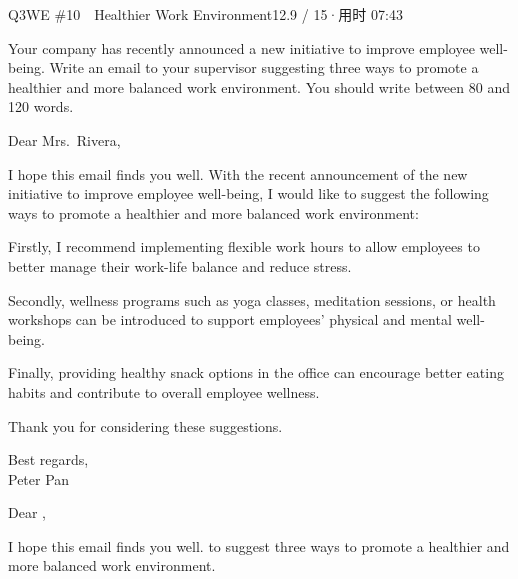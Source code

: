 \begin{qblock}{Q3\quad WE \#10\ \ Healthier Work Environment}{12.9 / 15\quad·\quad 用时 07:43}

\begin{promptbox}
Your company has recently announced a new initiative to improve employee well-being. Write an email to your supervisor suggesting three ways to promote a healthier and more balanced work environment. You should write between 80 and 120 words.
\end{promptbox}

\begin{modelbox}
Dear Mrs.\ Rivera,

I hope this email finds you well. With the recent announcement of the new initiative to improve employee well-being, I would like to suggest the following ways to promote a healthier and more balanced work environment:

Firstly, I recommend implementing flexible work hours to allow employees to better manage their work-life balance and reduce stress.

Secondly, wellness programs such as yoga classes, meditation sessions, or health workshops can be introduced to support employees' physical and mental well-being.

Finally, providing healthy snack options in the office can encourage better eating habits and contribute to overall employee wellness.

Thank you for considering these suggestions.

Best regards,\\ Peter Pan
\end{modelbox}

\begin{youbox}
Dear ,

I hope this email finds you well.  to suggest three ways to promote a healthier and more balanced work environment.


\end{youbox}
\end{qblock}
